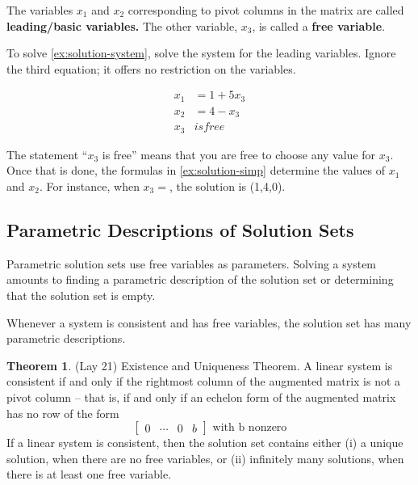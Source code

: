 \documentclass[12pt]{article}
\theoremstyle{definition}
\newtheorem{theorem}{Theorem}  %
\numberwithin{equation}{theorem}    %
\newcommand{\drawvec}[1]{                    %
    \begin{bmatrix}
        #1
    \end{bmatrix}
}
\begin{document}
The variables $x_1$ and $x_2$ corresponding to pivot columns in the matrix are called \textbf{leading/basic variables.} The other variable, $x_3$, is called a \textbf{free variable}.

To solve \ref{ex:solution-system}, solve the system for the leading variables. Ignore the third equation; it offers no restriction on the variables.

\begin{align} \label{ex:solution-simp}
    x_1 & = 1+5x_3 \\
    x_2 & = 4-x_3  \\
    x_3 & is free
\end{align}

The statement ``$x_3$ is free'' means that you are free to choose any value for $x_3$. Once that is done, the formulas in \ref{ex:solution-simp} determine the values of $x_1$ and $x_2$. For instance, when $x_3=$, the solution is (1,4,0).

\subsection{Parametric Descriptions of Solution Sets}

Parametric solution sets use free variables as parameters. Solving a system amounts to finding a parametric description of the solution set or determining that the solution set is empty.

Whenever a system is consistent and has free variables, the solution set has many parametric descriptions.

\begin{theorem}(Lay 21) Existence and Uniqueness Theorem.
    A linear system is consistent if and only if the rightmost column of the augmented matrix is not a pivot column -- that is, if and only if an echelon form of the augmented matrix has no row of the form $$\drawvec{0 & \cdots & 0 & b} \text{ with b nonzero}$$ If a linear system is consistent, then the solution set contains either (i) a unique solution, when there are no free variables, or (ii) infinitely many solutions, when there is at least one free variable.
\end{theorem}
\end{document}

